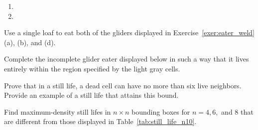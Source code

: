 \begin{multicols}{2}
\begin{problemstar}
		\begin{multicols}{2}
			\begin{enumerate}
				\item[\bf\color{ocre}(a)] 
				
				\item[\bf\color{ocre}(b)] 
			\end{enumerate}
		\end{multicols}
	\end{problemstar}
	
	
	\mfilbreak
	
	
	\begin{problem}\label{exer:loaf_eater}
		Use a single loaf to eat both of the gliders displayed in Exercise~\ref{exer:eater_weld}(a), (b), and (d).
	\end{problem}
	
	
	\mfilbreak
	
	
	\begin{problemstar}\label{exer:incomplete_glider_eater}
		Complete the incomplete glider eater displayed below in such a way that it lives entirely within the region specified by the light gray cells.
		
		\begin{center}
		\end{center}
	\end{problemstar}
	
	
	\mfilbreak
	
	
	\begin{problemstar}\label{exer:still_lifes_6_neigh}
		Prove that in a still life, a dead cell can have no more than six live neighbors. Provide an example of a still life that attains this bound.
	\end{problemstar}
	
	
	\mfilbreak
	
	
	\begin{problem}\label{exer:densest_still_lifes}
		Find maximum-density still lifes in $n \times n$ bounding boxes for $n = 4, 6,$ and $8$ that are different from those displayed in Table~\ref{tab:still_life_n10}.
	\end{problem}
	

\end{multicols}
